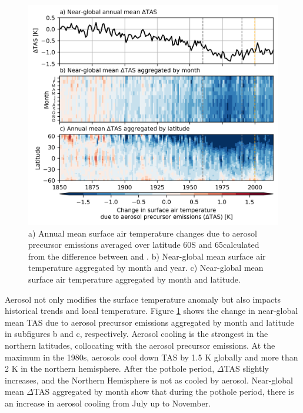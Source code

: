 \begin{figure}
    \centering
    \includegraphics{Chapter4/Figs/tas_change_aerosols.png}
    \caption[Surface air temperature changes due to aerosol precursor emissions]{a) Annual mean surface air temperature changes due to aerosol precursor emissions averaged over latitude 60\textdegree S and 65\textdegree calculated from the difference between \hist{} and \histpiaer{}. b) Near-global mean surface air temperature aggregated by month and year. c) Near-global mean surface air temperature aggregated by month and latitude.}
    \label{fig:ch4:tas-change-aerosol}
\end{figure}


Aerosol not only modifies the surface temperature anomaly but also impacts historical trends and local temperature. Figure \ref{fig:ch4:tas-change-aerosol} shows the change in near-global mean TAS due to aerosol precursor emissions aggregated by month and latitude in subfigures b and c, respectively. Aerosol cooling is the strongest in the northern latitudes, collocating with the aerosol precursor emissions. At the maximum in the 1980s, aerosols cool down TAS by 1.5 K globally and more than 2 K in the northern hemisphere. After the pothole period, $\Delta$TAS slightly increases, and the Northern Hemisphere is not as cooled by aerosol. Near-global mean $\Delta$TAS aggregated by month show that during the pothole period, there is an increase in aerosol cooling from July up to November.


